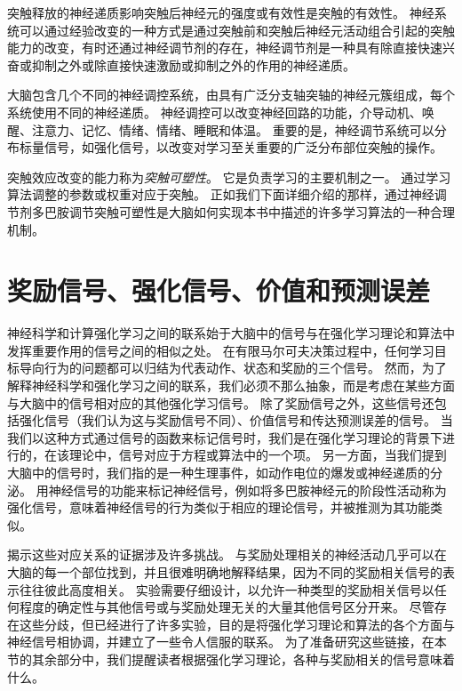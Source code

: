 突触释放的神经递质影响突触后神经元的强度或有效性是突触的有效性。
神经系统可以通过经验改变的一种方式是通过突触前和突触后神经元活动组合引起的突触能力的改变，有时还通过神经调节剂的存在，神经调节剂是一种具有除直接快速兴奋或抑制之外或除直接快速激励或抑制之外的作用的神经递质。


大脑包含几个不同的神经调控系统，由具有广泛分支轴突轴的神经元簇组成，每个系统使用不同的神经递质。
神经调控可以改变神经回路的功能，介导动机、唤醒、注意力、记忆、情绪、情绪、睡眠和体温。
重要的是，神经调节系统可以分布标量信号，如强化信号，以改变对学习至关重要的广泛分布部位突触的操作。


突触效应改变的能力称为\textit{突触可塑性}。
它是负责学习的主要机制之一。
通过学习算法调整的参数或权重对应于突触。
正如我们下面详细介绍的那样，通过神经调节剂多巴胺调节突触可塑性是大脑如何实现本书中描述的许多学习算法的一种合理机制。


\section{奖励信号、强化信号、价值和预测误差} \label{sec:reward_signals}

神经科学和计算强化学习之间的联系始于大脑中的信号与在强化学习理论和算法中发挥重要作用的信号之间的相似之处。
在有限马尔可夫决策过程中，任何学习目标导向行为的问题都可以归结为代表动作、状态和奖励的三个信号。
然而，为了解释神经科学和强化学习之间的联系，我们必须不那么抽象，而是考虑在某些方面与大脑中的信号相对应的其他强化学习信号。
除了奖励信号之外，这些信号还包括强化信号（我们认为这与奖励信号不同）、价值信号和传达预测误差的信号。
当我们以这种方式通过信号的函数来标记信号时，我们是在强化学习理论的背景下进行的，在该理论中，信号对应于方程或算法中的一个项。
另一方面，当我们提到大脑中的信号时，我们指的是一种生理事件，如动作电位的爆发或神经递质的分泌。
用神经信号的功能来标记神经信号，例如将多巴胺神经元的阶段性活动称为强化信号，意味着神经信号的行为类似于相应的理论信号，并被推测为其功能类似。



揭示这些对应关系的证据涉及许多挑战。
与奖励处理相关的神经活动几乎可以在大脑的每一个部位找到，并且很难明确地解释结果，因为不同的奖励相关信号的表示往往彼此高度相关。
实验需要仔细设计，以允许一种类型的奖励相关信号以任何程度的确定性与其他信号或与奖励处理无关的大量其他信号区分开来。
尽管存在这些分歧，但已经进行了许多实验，目的是将强化学习理论和算法的各个方面与神经信号相协调，并建立了一些令人信服的联系。
为了准备研究这些链接，在本节的其余部分中，我们提醒读者根据强化学习理论，各种与奖励相关的信号意味着什么。


